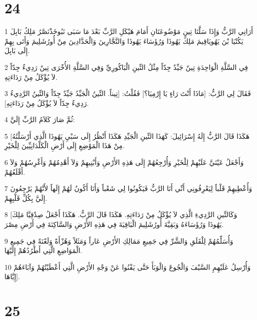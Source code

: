 \chapter{24}

\par 1 أَرَانِي الرَّبُّ وَإِذَا سَلَّتَا تِينٍ مَوْضُوعَتَانِ أَمَامَ هَيْكَلِ الرَّبِّ بَعْدَ مَا سَبَى نَبُوخَذْنَصَّرُ مَلِكُ بَابِلَ يَكُنْيَا بْنَ يَهُويَاقِيمَ مَلِكَ يَهُوذَا وَرُؤَسَاءَ يَهُوذَا وَالنَّجَّارِينَ وَالْحَدَّادِينَ مِنْ أُورُشَلِيمَ وَأَتَى بِهِمْ إِلَى بَابِلَ.
\par 2 فِي السَّلَّةِ الْوَاحِدَةِ تِينٌ جَيِّدٌ جِدّاً مِثْلُ التِّينِ الْبَاكُورِيِّ وَفِي السَّلَّةِ الأُخْرَى تِينٌ رَدِيءٌ جِدّاً لاَ يُؤْكَلُ مِنْ رَدَاءَتِهِ.
\par 3 فَقَالَ لِي الرَّبُّ: [مَاذَا أَنْتَ رَاءٍ يَا إِرْمِيَا؟] فَقُلْتُ: [تِيناً. التِّينُ الْجَيِّدُ جَيِّدٌ جِدّاً وَالتِّينُ الرَّدِيءُ رَدِيءٌ جِدّاً لاَ يُؤْكَلُ مِنْ رَدَاءَتِهِ].
\par 4 ثُمَّ صَارَ كَلاَمُ الرَّبِّ إِلَيَّ:
\par 5 [هَكَذَا قَالَ الرَّبُّ إِلَهُ إِسْرَائِيلَ: كَهَذَا التِّينِ الْجَيِّدِ هَكَذَا أَنْظُرُ إِلَى سَبْيِ يَهُوذَا الَّذِي أَرْسَلْتُهُ مِنْ هَذَا الْمَوْضِعِ إِلَى أَرْضِ الْكَلْدَانِيِّينَ لِلْخَيْرِ.
\par 6 وَأَجْعَلُ عَيْنَيَّ عَلَيْهِمْ لِلْخَيْرِ وَأُرْجِعُهُمْ إِلَى هَذِهِ الأَرْضِ وَأَبْنِيهِمْ وَلاَ أَهْدِمُهُمْ وَأَغْرِسُهُمْ وَلاَ أَقْلَعُهُمْ.
\par 7 وَأُعْطِيهِمْ قَلْباً لِيَعْرِفُونِي أَنِّي أَنَا الرَّبُّ فَيَكُونُوا لِي شَعْباً وَأَنَا أَكُونُ لَهُمْ إِلَهاً لأَنَّهُمْ يَرْجِعُونَ إِلَيَّ بِكُلِّ قَلْبِهِمْ.
\par 8 [وَكَالتِّينِ الرَّدِيءِ الَّذِي لاَ يُؤْكَلُ مِنْ رَدَاءَتِهِ. هَكَذَا قَالَ الرَّبُّ. هَكَذَا أَجْعَلُ صِدْقِيَّا مَلِكَ يَهُوذَا وَرُؤَسَاءَهُ وَبَقِيَّةَ أُورُشَلِيمَ الْبَاقِيَةَ فِي هَذِهِ الأَرْضِ وَالسَّاكِنَةَ فِي أَرْضِ مِصْرَ.
\par 9 وَأُسَلِّمُهُمْ لِلْقَلَقِ وَالشَّرِّ فِي جَمِيعِ مَمَالِكِ الأَرْضِ عَاراً وَمَثَلاً وَهُزْأَةً وَلَعْنَةً فِي جَمِيعِ الْمَوَاضِعِ الَّتِي أَطْرُدُهُمْ إِلَيْهَا.
\par 10 وَأُرْسِلُ عَلَيْهِمِ السَّيْفَ وَالْجُوعَ وَالْوَبَأَ حَتَّى يَفْنُوا عَنْ وَجْهِ الأَرْضِ الَّتِي أَعْطَيْتُهُمْ وَآبَاءَهُمْ إِيَّاهَا].

\chapter{25}

